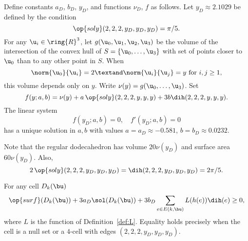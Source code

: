 \begin{definition}[$a_D$,~$b_D$,~$y_D$,~$\nu_D$,~$f$]
  Define constants $a_D$, $b_D$, $y_D$, and functions $\nu_D$, $f$ as
  follows.  Let $y_D\approx 2.1029$ be defined by the condition
\[
\op{soly}(2,2,2,y_D,y_D,y_D) = \pi/5.
\]
For any $\u_i\in\ring{R}^3$, let $g(\u_0,\u_1,\u_2,\u_3)$ be the
volume of the intersection of the convex hull of
$S=\{\u_0,\ldots,\u_3\}$ with set of points closer to $ \u_0$ than to
any other point in $S$.  When
\begin{equation}\label{eqn:uy}
  \norm{\u_0}{\u_i}=2\textand \norm{ \u_i}{ \u_j} = y\text{ for }i,j\ge 1,
\end{equation} 
this volume depends only on $y$. Write $\nu(y) = g(\u_0,\ldots,\u_3)$.
Set
\[
  f(y;a,b) = \nu(y) +  a\, \op{soly}(2,2,2,y,y,y) + 3 b \dih(2,2,2,y,y,y).
\]
The linear system
\begin{equation}\label{eqn:fyD}
f(y_D;a,b) = 0,\quad f'(y_D;a,b) = 0
\end{equation}
has a unique solution in $a,b$ with values $a=a_D\approx -0.581$,
$b=b_D\approx 0.0232$.
\end{definition}
%
%
%
%
%
%

Note that the regular dodecahedron has volume $20 \nu(y_D)$ and surface
area $60 \nu(y_D)$.  Also,
\begin{equation}
  2\,\op{soly}(2,2,2,y_D,y_D,y_D) =\dih(2,2,2,y_D,y_D,y_D)=2\pi/5.
\end{equation}
%
%

\begin{lemma}\label{lemma:D-local}
For any cell $D_k(\bu)$
\[
  \op{surf}(D_k(\bu)) + 3 a_D \sol(D_k(\bu)) 
+ 3 b_D \sum_{e\in E(k,\bu)} L(h(e)) \dih(e) \ge 0,
\]
where $L$ is the function of Definition~\ref{def:L}.  Equality holds
precisely when the cell is a null set or a $4$-cell with edges
$(2,2,2,y_D,y_D,y_D)$.
\end{lemma}
%



